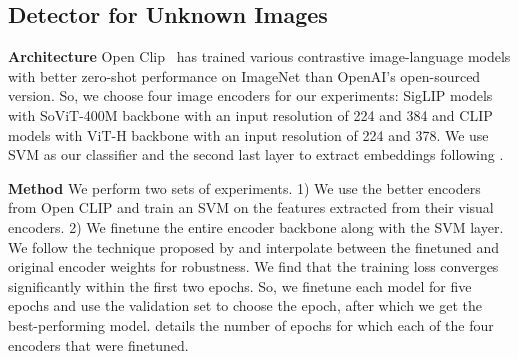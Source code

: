 \subsection{Detector for Unknown Images}

\noindent\textbf{Architecture} Open Clip~\cite{ilharco_openclip_2021} has trained various contrastive image-language models with better zero-shot performance on ImageNet \cite{imagenet} than OpenAI's open-sourced version. So, we choose four image encoders for our experiments: SigLIP \cite{zhai2023sigmoid} models with SoViT-400M \cite{alabdulmohsin2024getting} backbone with an input resolution of 224 and 384 and CLIP models with ViT-H \cite{dosovitskiy2020vit} backbone with an input resolution of 224 and 378. We use SVM as our classifier and the second last layer to extract embeddings following \cite{cozzolino2024raising}.

\noindent\textbf{Method} We perform two sets of experiments. 1) We use the better encoders from Open CLIP and train an SVM on the features extracted from their visual encoders. 2) We finetune the entire encoder backbone along with the SVM layer. We follow the technique proposed by \citet{wortsman2022robust} and interpolate between the finetuned and original encoder weights for robustness. We find that the training loss converges significantly within the first two epochs. So, we finetune each model for five epochs and use the validation set to choose the epoch, after which we get the best-performing model.  details the number of epochs for which each of the four encoders that were finetuned.

